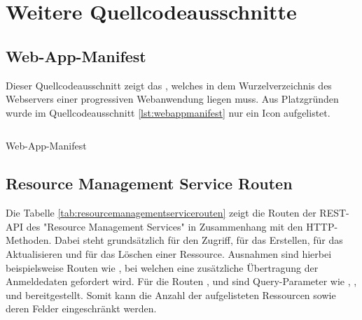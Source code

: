 \chapter{Weitere Quellcodeausschnitte}
\label{chap:weiterequellcodeausschnitte}

\section*{Web-App-Manifest}
\label{sec:webappmanifest}
Dieser Quellcodeausschnitt zeigt das , welches in dem Wurzelverzeichnis
des Webservers einer progressiven Webanwendung liegen muss. Aus Platzgründen wurde im Quellcodeausschnitt
\ref{lst:webappmanifest} nur ein Icon aufgelistet.

\begin{listing}[h]
    \inputminted{jsx}{snippets/json/manifest.json}
    \caption{Web-App-Manifest}
    \label{lst:webappmanifest}
\end{listing}

\newpage

\section*{Resource Management Service Routen}
\label{sec:resourcemanagementservicerouten}
Die Tabelle \ref{tab:resourcemanagementservicerouten} zeigt die
Routen der REST-API des "Resource Management Services" in Zusammenhang
mit den HTTP-Methoden. Dabei steht grundsätzlich  für den Zugriff,
 für das Erstellen,  für das Aktualisieren und 
für das Löschen einer Ressource. Ausnahmen sind hierbei beispielsweise Routen wie
, bei welchen eine zusätzliche Übertragung der Anmeldedaten
gefordert wird. Für die Routen ,  und 
sind Query-Parameter wie , ,  und
 bereitgestellt. Somit kann die Anzahl der aufgelisteten Ressourcen
sowie deren Felder eingeschränkt werden.

